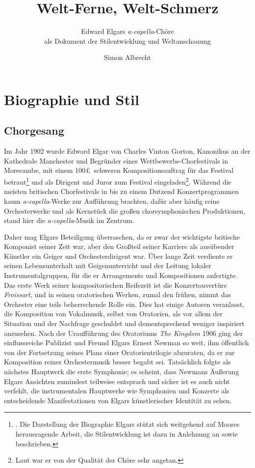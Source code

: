 \documentclass[a4paper,11pt,open=any]{scrbook}
\author{Simon Albrecht}
\title{Welt-Ferne, Welt-Schmerz}
\subtitle{
Edward Elgars \textit{a-capella}-Chöre \\
als Dokument der Stilentwicklung und Weltanschauung
}
\begin{document}
\maketitle

\tableofcontents

\chapter{Biographie und Stil}

\section{Chorgesang}
Im Jahr 1902 wurde Edward Elgar von Charles Vinton Gorton, Kanonikus an der
Kathedrale Manchester und Begründer eines Wettbewerbs-Chorfestivals in Morecambe,
mit einem 100\pounds\ schweren Kompositionsauftrag für das Festival
betraut\footnote{\cite[S.~376]{moore}.  Die Darstellung der Biographie
Elgars stützt sich weitgehend auf Moores herausragende Arbeit, die
Stilentwicklung ist dazu in Anlehnung an \cite[S.~12–24]{harperscott2006}
sowie \cite{butt-rcath} beschrieben.} und als Dirigent und Juror zum Festival
eingeladen\footnote{\cite[S.~viii.]{ece13}  Laut \cite[S.~128f.]{elgar-letters}
war er von der Qualität der Chöre sehr angetan.}.  Während die meisten
britischen Chorfestivals in bis zu einem Dutzend Konzertprogrammen kaum \textit{a-capella}-Werke
zur Aufführung brachten, dafür aber häufig reine Orchesterwerke und als
Kernstück die großen chorsymphonischen Produktionen, stand hier die \textit{a-capella}-Musik
im Zentrum.

Daher mag Elgars Beteiligung überraschen, da er zwar der wichtigste britische
Komponist seiner Zeit war, aber den Großteil seiner Karriere als ausübender
Künstler ein Geiger und Orchesterdirigent war.  Über lange Zeit verdiente
er seinen Lebensunterhalt mit Geigenunterricht und der Leitung lokaler
Instrumentalgruppen, für die er Arrangements und Kompositionen anfertigte.
Das erste Werk seiner kompositorischen Reifezeit ist die Konzertouvertüre
\textit{Froissart}, und in seinen oratorischen Werken, zumal den frühen,
nimmt das Orchester eine teils beherrschende Rolle ein.  Dies hat einige
Autoren veranlasst, die Komposition von Vokalmusik, selbst von Oratorien,
als vor allem der Situation und der Nachfrage geschuldet und dementsprechend
weniger inspiriert anzusehen.  Nach der Uraufführung des Oratoriums \textit{The
Kingdom} 1906 ging der einflussreiche Publizist und Freund Elgars Ernest
Newman so weit, ihm öffentlich von der Fortsetzung seines Plans einer
Oratorientrilogie abzuraten\cite[S.~507]{moore}, da er zur Komposition
reiner Orchestermusik besser begabt sei.  Tatsächlich folgte als nächstes
Hauptwerk die erste Symphonie; es scheint, dass Newmans Äußerung Elgars
Ansichten zumindest teilweise entsprach und sicher ist es auch nicht
verfehlt, die instrumentalen Hauptwerke wie Symphonien und Konzerte als
entscheidende Manifestationen von Elgars künstlerischer Identität zu sehen.
\end{document}
